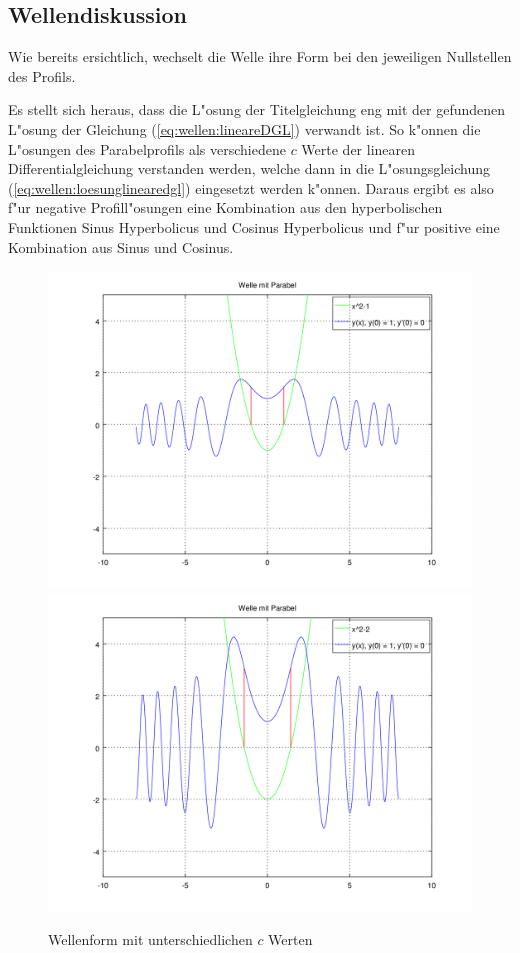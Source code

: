 \subsection{Wellendiskussion}
\label{sec:wellen:diskussionwellenform}

Wie bereits ersichtlich, wechselt die Welle ihre Form bei den jeweiligen 
Nullstellen des Profils.

Es stellt sich heraus, dass die L"osung der Titelgleichung eng mit der 
gefundenen L"osung der Gleichung (\ref{eq:wellen:lineareDGL}) verwandt ist. So 
k"onnen die L"osungen des Parabelprofils als verschiedene $c$ Werte der 
linearen Differentialgleichung verstanden werden, welche dann in die 
L"osungsgleichung (\ref{eq:wellen:loesunglinearedgl}) eingesetzt werden 
k"onnen. Daraus ergibt es also f"ur negative Profill"osungen eine Kombination 
aus den hyperbolischen Funktionen Sinus Hyperbolicus und Cosinus Hyperbolicus 
und f"ur positive eine Kombination aus Sinus und Cosinus.

\begin{figure}
	\includegraphics[scale=0.35]{./wellen/images/varc/cneg1.png}
	\includegraphics[scale=0.35]{./wellen/images/varc/cneg2.png}
	\caption{Wellenform mit unterschiedlichen $c$ Werten}
	\label{fig:wellen:variablec}
\end{figure}

